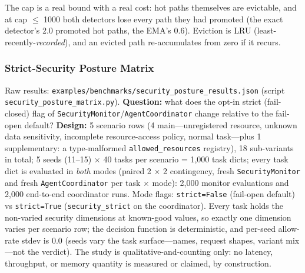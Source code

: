\documentclass[
  11pt,
]{article}
\begin{document}
The cap is a real bound with a real cost: hot paths themselves are
evictable, and at cap \(\leq\) 1000 both detectors lose every path they
had promoted (the exact detector's 2.0 promoted hot paths, the EMA's
0.6). Eviction is LRU (least-recently-\emph{recorded}), and an evicted
path re-accumulates from zero if it recurs.

\subsubsection{Strict-Security Posture
Matrix}\label{strict-security-posture-matrix}

Raw results:
\texttt{examples/benchmarks/security\_posture\_results.json} (script
\texttt{security\_posture\_matrix.py}). \textbf{Question:} what does the
opt-in strict (fail-closed) flag of
\texttt{SecurityMonitor}/\texttt{AgentCoordinator} change relative to
the fail-open default? \textbf{Design:} 5 scenario rows (4
main---unregistered resource, unknown data sensitivity, incomplete
resource-access policy, normal task---plus 1 supplementary: a
type-malformed \texttt{allowed\_resources} registry), 18 sub-variants in
total; 5 seeds (11--15) \(\times\) 40 tasks per scenario = 1,000 task
dicts; every task dict is evaluated in \emph{both} modes (paired 2
\(\times\) 2 contingency, fresh \texttt{SecurityMonitor} and fresh
\texttt{AgentCoordinator} per task \(\times\) mode): 2,000 monitor
evaluations and 2,000 end-to-end coordinator runs. Mode flags:
\texttt{strict=False} (fail-open default) vs \texttt{strict=True}
(\texttt{security\_strict} on the coordinator). Every task holds the
non-varied security dimensions at known-good values, so exactly one
dimension varies per scenario row; the decision function is
deterministic, and per-seed allow-rate stdev is 0.0 (seeds vary the task
surface---names, request shapes, variant mix---not the verdict). The
study is qualitative-and-counting only: no latency, throughput, or
memory quantity is measured or claimed, by construction.
\end{document}
